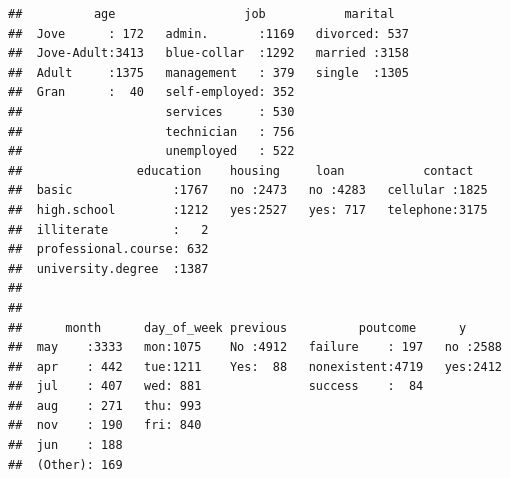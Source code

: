 \documentclass[
]{article}
\newenvironment{Shaded}{\begin{snugshade}}{\end{snugshade}}
\newcommand{\AttributeTok}[1]{\textcolor[rgb]{0.77,0.63,0.00}{#1}}
\newcommand{\DecValTok}[1]{\textcolor[rgb]{0.00,0.00,0.81}{#1}}
\newcommand{\FunctionTok}[1]{\textcolor[rgb]{0.00,0.00,0.00}{#1}}
\newcommand{\NormalTok}[1]{#1}
\newcommand{\OtherTok}[1]{\textcolor[rgb]{0.56,0.35,0.01}{#1}}
\newcommand{\SpecialCharTok}[1]{\textcolor[rgb]{0.00,0.00,0.00}{#1}}
\begin{document}
\begin{Shaded}
\end{Shaded}

\begin{verbatim}
##          age                  job           marital    
##  Jove      : 172   admin.       :1169   divorced: 537  
##  Jove-Adult:3413   blue-collar  :1292   married :3158  
##  Adult     :1375   management   : 379   single  :1305  
##  Gran      :  40   self-employed: 352                  
##                    services     : 530                  
##                    technician   : 756                  
##                    unemployed   : 522                  
##                education    housing     loan           contact    
##  basic              :1767   no :2473   no :4283   cellular :1825  
##  high.school        :1212   yes:2527   yes: 717   telephone:3175  
##  illiterate         :   2                                         
##  professional.course: 632                                         
##  university.degree  :1387                                         
##                                                                   
##                                                                   
##      month      day_of_week previous          poutcome      y       
##  may    :3333   mon:1075    No :4912   failure    : 197   no :2588  
##  apr    : 442   tue:1211    Yes:  88   nonexistent:4719   yes:2412  
##  jul    : 407   wed: 881               success    :  84             
##  aug    : 271   thu: 993                                            
##  nov    : 190   fri: 840                                            
##  jun    : 188                                                       
##  (Other): 169
\end{verbatim}

\begin{Shaded}
\end{Shaded}
\end{document}

